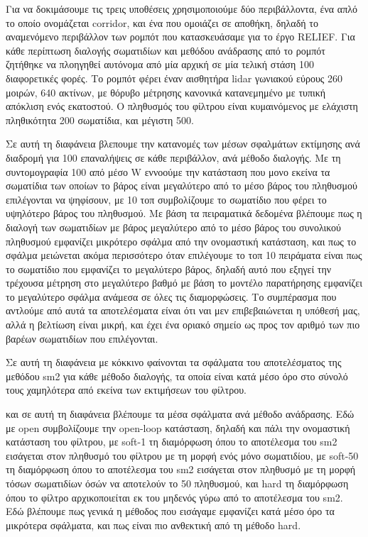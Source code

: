 \documentclass[a4paper,10pt]{article}
\begin{document}
Για να δοκιμάσουμε τις τρεις υποθέσεις χρησιμοποιούμε δύο περιβάλλοντα, ένα
απλό το οποίο ονομάζεται corridor, και ένα που ομοιάζει σε αποθήκη, δηλαδή το
αναμενόμενο περιβάλλον των ρομπότ που κατασκευάσαμε για το έργο RELIEF. Για
κάθε περίπτωση διαλογής σωματιδίων και μεθόδου ανάδρασης από το ρομπότ ζητήθηκε
να πλοηγηθεί αυτόνομα από μία αρχική σε μία τελική στάση 100 διαφορετικές
φορές. Το ρομπότ φέρει έναν αισθητήρα lidar γωνιακού εύρους 260 μοιρών, 640
ακτίνων, με θόρυβο μέτρησης κανονικά κατανεμημένο με τυπική απόκλιση ενός
εκατοστού. Ο πληθυσμός του φίλτρου είναι κυμαινόμενος με ελάχιστη πληθικότητα
200 σωματίδια, και μέγιστη 500.

Σε αυτή τη διαφάνεια βλεπουμε την κατανομές των μέσων σφαλμάτων εκτίμησης ανά
διαδρομή για 100 επαναλήψεις σε κάθε περιβάλλον, ανά μέθοδο διαλογής. Με τη
συντομογραφία 100%
από μέσο W εννοούμε την κατάσταση που μονο εκείνα τα σωματίδια των οποίων το
βάρος είναι μεγαλύτερο από το μέσο βάρος του πληθυσμού επιλέγονται να ψηφίσουν,
με 10%
τοπ συμβολίζουμε το σωματίδιο που φέρει το υψηλότερο βάρος του πληθυσμού. Με
βάση τα πειραματικά δεδομένα βλέπουμε πως η διαλογή των σωματιδίων με βάρος
μεγαλύτερο από το μέσο βάρος του συνολικού πληθυσμού εμφανίζει μικρότερο σφάλμα
από την ονομαστική κατάσταση, και πως το σφάλμα μειώνεται ακόμα περισσότερο
όταν επιλέγουμε το τοπ 10%
πειράματα είναι πως το σωματίδιο που εμφανίζει το μεγαλύτερο βάρος, δηλαδή αυτό
που εξηγεί την τρέχουσα μέτρηση στο μεγαλύτερο βαθμό με βάση το μοντέλο
παρατήρησης εμφανίζει το μεγαλύτερο σφάλμα ανάμεσα σε όλες τις διαμορφώσεις. Το
συμπέρασμα που αντλούμε από αυτά τα αποτελέσματα είναι ότι ναι μεν
επιβεβαιώνεται η υπόθεσή μας, αλλά η βελτίωση είναι μικρή, και έχει ένα οριακό
σημείο ως προς τον αριθμό των πιο βαρέων σωματιδίων που επιλέγονται.

Σε αυτή τη διαφάνεια με κόκκινο φαίνονται τα σφάλματα του αποτελέσματος της
μεθόδου sm2 για κάθε μέθοδο διαλογής, τα οποία είναι κατά μέσο όρο στο σύνολό
τους χαμηλότερα από εκείνα των εκτιμήσεων του φίλτρου.

και σε αυτή τη διαφάνεια βλέπουμε τα μέσα σφάλματα ανά μέθοδο
ανάδρασης. Εδώ με open συμβολίζουμε την open-loop κατάσταση, δηλαδή και πάλι
την ονομαστική κατάσταση του φίλτρου, με soft-1 τη διαμόρφωση όπου το
αποτέλεσμα του sm2 εισάγεται στον πληθυσμό του φίλτρου με τη μορφή ενός μόνο
σωματιδίου, με soft-50 τη διαμόρφωση όπου το αποτέλεσμα του sm2 εισάγεται στον
πληθυσμό με τη μορφή τόσων σωματιδίων όσών να αποτελούν το 50%
πληθυσμού, και hard τη διαμόρφωση όπου το φίλτρο αρχικοποιείται εκ του μηδενός
γύρω από το αποτέλεσμα του sm2. Εδώ βλέπουμε πως γενικά η μέθοδος που εισάγαμε
εμφανίζει κατά μέσο όρο τα μικρότερα σφάλματα, και πως είναι πιο ανθεκτική από
τη μέθοδο hard.
\end{document}
